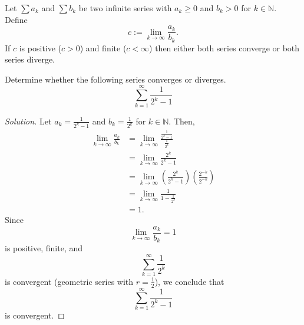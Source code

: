 \documentclass[compacto,10pt,comentarios]{aleph-notas}
\begin{document}
\begin{teo}
    Let $\sum a_k$ and $\sum b_k$ be two infinite series with $a_k \geq 0$ and $b_k > 0$ for $k \in \mathbb{N}$. Define
    $$
        c := \lim_{k \to \infty} \frac{a_k}{b_k}.
    $$
    If $c$ is positive ($c > 0$) and finite ($c < \infty$) then either both series converge or both series diverge.
\end{teo}

\begin{ejer}
    Determine whether the following series converges or diverges.
    $$
        \sum_{k=1}^{\infty} \frac{1}{2^{k} - 1}
    $$
\end{ejer}
\begin{proof}[Solution]
    Let $a_k = \frac{1}{2^{k} - 1}$ and $b_k = \frac{1}{2^{k}}$ for $k \in \mathbb{N}$. Then,
    \begin{align*}
        \lim_{k \to \infty} \frac{a_k}{b_k}
            & = \lim_{k \to \infty} \frac{\frac{1}{2^{k} - 1}}{\frac{1}{2^{k}}} \\
            & = \lim_{k \to \infty} \frac{2^{k}}{2^{k} - 1} \\
            & = \lim_{k \to \infty} \left( \frac{2^{k}}{2^{k} - 1} \right) \left( \frac{2^{-k}}{2^{-k}} \right) \\
            & = \lim_{k \to \infty} \frac{1}{1 - \frac{1}{2^{k}}} \\
            & = 1.
    \end{align*}
    Since 
    $$
    \lim_{k \to \infty} \frac{a_k}{b_k} = 1
    $$
    is positive, finite, and
    $$
        \sum_{k=1}^{\infty} \frac{1}{2^{k}}
    $$
    is convergent (geometric series with $r=\frac{1}{2}$), we conclude that 
    $$
        \sum_{k=1}^{\infty} \frac{1}{2^{k} - 1}
    $$
    is convergent.
\end{proof}
\end{document}
